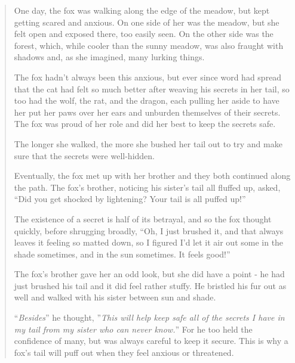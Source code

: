 \begin{quote}
One day, the fox was walking along the edge of the meadow, but kept
getting scared and anxious. On one side of her was the meadow, but she
felt open and exposed there, too easily seen. On the other side was the
forest, which, while cooler than the sunny meadow, was also fraught with
shadows and, as she imagined, many lurking things.

The fox hadn't always been this anxious, but ever since word had spread
that the cat had felt so much better after weaving his secrets in her
tail, so too had the wolf, the rat, and the dragon, each pulling her
aside to have her put her paws over her ears and unburden themselves of
their secrets. The fox was proud of her role and did her best to keep
the secrets safe.

The longer she walked, the more she bushed her tail out to try and make
sure that the secrets were well-hidden.

Eventually, the fox met up with her brother and they both continued
along the path. The fox's brother, noticing his sister's tail all
fluffed up, asked, ``Did you get shocked by lightening? Your tail is all
puffed up!''

The existence of a secret is half of its betrayal, and so the fox
thought quickly, before shrugging broadly, ``Oh, I just brushed it, and
that always leaves it feeling so matted down, so I figured I'd let it
air out some in the shade sometimes, and in the sun sometimes. It feels
good!''

The fox's brother gave her an odd look, but she did have a point - he
had just brushed his tail and it did feel rather stuffy. He bristled his
fur out as well and walked with his sister between sun and shade.

``\emph{Besides}'' he thought, ''\emph{This will help keep safe all of
the secrets I have in my tail from my sister who can never know.}'' For
he too held the confidence of many, but was always careful to keep it
secure. This is why a fox's tail will puff out when they feel anxious or
threatened.
\end{quote}
